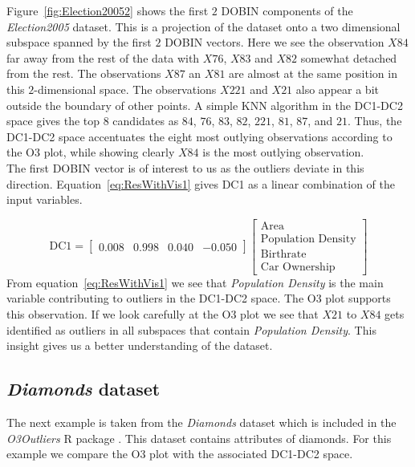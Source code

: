 \documentclass[11pt]{article}
\begin{document}
Figure~\ref{fig:Election20052} shows the first $2$ DOBIN components of the \textit{Election2005} dataset. This is a projection of the dataset onto a two dimensional subspace spanned by the first $2$ DOBIN vectors. Here we see the observation $X84$ far away from the rest of the data with $X76$, $X83$ and $X82$ somewhat detached from the rest. The observations $X87$ an $X81$ are almost at the same position in this $2$-dimensional space. The observations $X221$ and $X21$ also appear a bit outside the boundary of  other points. A simple KNN algorithm in the DC1-DC2 space gives the top $8$ candidates as $84$, $76$,  $83$, $82$, $221$, $81$, $87$, and  $21$. Thus, the DC1-DC2 space accentuates the eight most outlying observations according to the O3 plot, while showing clearly $X84$ is the most outlying observation. \\

The first DOBIN vector is of interest to us as the outliers deviate in this direction. Equation~\eqref{eq:ResWithVis1} gives DC1 as a linear combination of the input variables. 

\begin{equation}\label{eq:ResWithVis1}
    \text{DC1} = \begin{bmatrix}
    0.008 & 0.998 & 0.040 & -0.050  
    \end{bmatrix}
    \begin{bmatrix}
    \text{Area} \\
    \text{Population Density} \\
    \text{Birthrate} \\
    \text{Car Ownership}
    \end{bmatrix}
\end{equation}
From equation~\eqref{eq:ResWithVis1} we see that \textit{Population Density} is the main variable contributing to outliers in the DC1-DC2 space. The O3 plot supports this observation. If we look carefully at the O3 plot we see that $X21$ to $X84$ gets identified as outliers in  all subspaces that contain \textit{Population Density}.  This insight gives us a better understanding of the dataset. 

\subsection{\textit{Diamonds} dataset}\label{sec:ResWithVis2}
The next example is taken from the \textit{Diamonds} dataset \citep{ggplot2} which is included in the \textit{O3Outliers} R package \citep{O3Rpack}. This dataset contains attributes of diamonds. For this example we compare the O3 plot with the associated DC1-DC2 space.  \\ 
\end{document}

